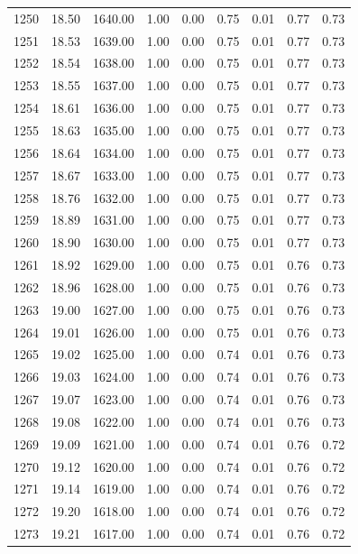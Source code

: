 \documentclass{article}\usepackage[]{graphicx}\usepackage[]{color}
\begin{document}
\begin{longtable}{rrrrrrrrr}
  1250 & 18.50 & 1640.00 & 1.00 & 0.00 & 0.75 & 0.01 & 0.77 & 0.73 \\ 
  1251 & 18.53 & 1639.00 & 1.00 & 0.00 & 0.75 & 0.01 & 0.77 & 0.73 \\ 
  1252 & 18.54 & 1638.00 & 1.00 & 0.00 & 0.75 & 0.01 & 0.77 & 0.73 \\ 
  1253 & 18.55 & 1637.00 & 1.00 & 0.00 & 0.75 & 0.01 & 0.77 & 0.73 \\ 
  1254 & 18.61 & 1636.00 & 1.00 & 0.00 & 0.75 & 0.01 & 0.77 & 0.73 \\ 
  1255 & 18.63 & 1635.00 & 1.00 & 0.00 & 0.75 & 0.01 & 0.77 & 0.73 \\ 
  1256 & 18.64 & 1634.00 & 1.00 & 0.00 & 0.75 & 0.01 & 0.77 & 0.73 \\ 
  1257 & 18.67 & 1633.00 & 1.00 & 0.00 & 0.75 & 0.01 & 0.77 & 0.73 \\ 
  1258 & 18.76 & 1632.00 & 1.00 & 0.00 & 0.75 & 0.01 & 0.77 & 0.73 \\ 
  1259 & 18.89 & 1631.00 & 1.00 & 0.00 & 0.75 & 0.01 & 0.77 & 0.73 \\ 
  1260 & 18.90 & 1630.00 & 1.00 & 0.00 & 0.75 & 0.01 & 0.77 & 0.73 \\ 
  1261 & 18.92 & 1629.00 & 1.00 & 0.00 & 0.75 & 0.01 & 0.76 & 0.73 \\ 
  1262 & 18.96 & 1628.00 & 1.00 & 0.00 & 0.75 & 0.01 & 0.76 & 0.73 \\ 
  1263 & 19.00 & 1627.00 & 1.00 & 0.00 & 0.75 & 0.01 & 0.76 & 0.73 \\ 
  1264 & 19.01 & 1626.00 & 1.00 & 0.00 & 0.75 & 0.01 & 0.76 & 0.73 \\ 
  1265 & 19.02 & 1625.00 & 1.00 & 0.00 & 0.74 & 0.01 & 0.76 & 0.73 \\ 
  1266 & 19.03 & 1624.00 & 1.00 & 0.00 & 0.74 & 0.01 & 0.76 & 0.73 \\ 
  1267 & 19.07 & 1623.00 & 1.00 & 0.00 & 0.74 & 0.01 & 0.76 & 0.73 \\ 
  1268 & 19.08 & 1622.00 & 1.00 & 0.00 & 0.74 & 0.01 & 0.76 & 0.73 \\ 
  1269 & 19.09 & 1621.00 & 1.00 & 0.00 & 0.74 & 0.01 & 0.76 & 0.72 \\ 
  1270 & 19.12 & 1620.00 & 1.00 & 0.00 & 0.74 & 0.01 & 0.76 & 0.72 \\ 
  1271 & 19.14 & 1619.00 & 1.00 & 0.00 & 0.74 & 0.01 & 0.76 & 0.72 \\ 
  1272 & 19.20 & 1618.00 & 1.00 & 0.00 & 0.74 & 0.01 & 0.76 & 0.72 \\ 
  1273 & 19.21 & 1617.00 & 1.00 & 0.00 & 0.74 & 0.01 & 0.76 & 0.72 \\ 

\end{longtable}
\end{document}

